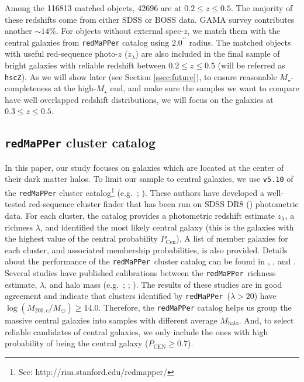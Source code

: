 \documentclass{emulateapj}
\def\arcsec{{\prime\prime}}
\def\redm{\texttt{redMaPPer}}
\def\mstar{{$M_{\star}$}}
\def\mhalo{{$M_{\mathrm{halo}}$}}
\begin{document}
\begin{CJK*}{UTF8}{gbsn}
    Among the 116813 matched objects, 42696 are at $0.2 \leq z \leq 0.5$.
    The majority of these redshifts come from either SDSS or BOSS data.  
    GAMA survey contributes another $\sim 14$\%. 
    For objects without external spec-$z$, we match them with the central galaxies 
    from \redm{} catalog using $2.0^{\arcsec}$ radius. 
    The matched objects with useful red-sequence photo-$z$ ($z_{\lambda}$) are also 
    included in the final sample of bright galaxies with reliable redshift between 
    $0.2 \leq z \leq 0.5$
    (will be referred as \texttt{hscZ}).
    As we will show later (see Section \ref{ssec:future}), to ensure reasonable 
    \mstar{}-completeness at the high-\mstar{} end, and make sure the samples we 
    want to compare have well overlapped redshift distributions, we will focus on 
    the galaxies at $0.3 \leq z \leq 0.5$. 

\subsection{\redm{}{} cluster catalog}
    \label{ssec:redmapper}
    
    In this paper, our study focuses on galaxies which are located at the center of
    their dark matter halos. To limit our sample to central galaxies, we use 
    \texttt{v5.10} of the \redm{}{} cluster 
    catalog\footnote{See: http://risa.stanford.edu/redmapper/} 
    (e.g.\ \citealt{Rykoff2014}; \citealt{Rozo2015b}). 
    These authors have developed a well-tested red-sequence cluster finder that has been 
    run on SDSS DR8 (\citealt{SDSSDR8}) photometric data. 
    For each cluster, the catalog provides a photometric redshift estimate $z_{\lambda}$, 
    a richness $\lambda$, and identified the most likely central
    galaxy (this is the galaxies with the highest value of the central probability 
    $P_{\mathrm{Cen}}$). 
    A list of member galaxies for each cluster, and associated membership probabilities, 
    is also provided. 
    Details about the performance of the \redm{}~cluster catalog can be found in 
    \citet{Rozo2014}, \citet{Rozo2015a}, and \citet{Rozo2015b}. 
    Several studies have published calibrations between the \redm{}~richness estimate, 
    $\lambda$, and halo mass (e.g.\ \citealt{Saro2015}; \citealt{Farahi2016}; 
    \citealt{Simet2016}). 
    The results of these studies are in good agreement and indicate that clusters 
    identified by \redm{}~($\lambda > 20$) have $\log (M_{200,c}/M_{\odot}) \geq 14.0$. 
    Therefore, the \redm{} catalog helps us group the massive central galaxies into 
    samples with different average \mhalo{}.  
    And, to select reliable candidates of central galaxies, we only include the ones 
    with high probability of being the central galaxy ($P_{\mathrm{CEN}} \geq 0.7$).
       

\end{CJK*}
\end{document}
